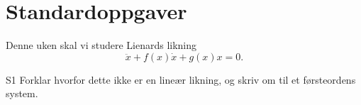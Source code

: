 \section*{Standardoppgaver}

Denne uken skal vi studere Lienards likning
\[
\ddot{x}+ f(x)\dot{x}+g(x)x=0.
\]


\begin{oppgave}{S1}
Forklar hvorfor dette ikke er en lineær likning, 
og skriv om til et førsteordens system.

\end{oppgave}